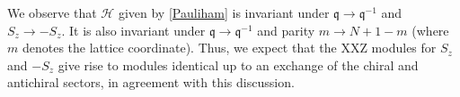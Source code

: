\documentclass[a4paper,10pt]{article}
\newcommand{\q}{\mathfrak{q}}
\newcommand{\linnea}[1]{$\framebox{\tiny L}$\ \textbf{\texttt{{\color{red}\footnotesize#1}}}}
\newcommand{\jesper}[1]{$\framebox{\tiny J}$\ \textbf{\texttt{{\color{cyan}\footnotesize#1}}}}
\newcommand{\aSt}{\mathcal{W}}
\newcommand{\AStTL}[2]{\aSt_{#1,#2}}
\newcommand{\Verma}[1]{\mathsf{V}_{#1}}
\newcommand{\FF}[1]{\widetilde{\mathsf{V}}_{#1}}
\newcommand{\Hlatt}{\mathcal{H}}
\begin{document}
%
%
%
%


We observe  that  %
$\Hlatt$ given by \eqref{Pauliham} is invariant under $\q\to \q^{-1}$ and $S_z\to -S_z$. It is also invariant under $\q\to \q^{-1}$ and parity $m \to N+1-m$ (where $m$ denotes the lattice coordinate). 
Thus, we expect that the XXZ modules for $S_z$ and $-S_z$ give rise to modules identical up to an exchange of the chiral and antichiral sectors, in agreement with this discussion.  %
\end{document}
